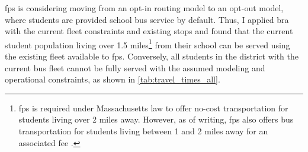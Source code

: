\gls{fps} is considering moving from an opt-in routing model to an opt-out model, where students are provided school bus service by default. Thus, I applied \gls{bra} with the current fleet constraints and existing stops and found that the current student population living over 1.5 miles\footnote{\gls{fps} is required under Massachusetts law to offer no-cost transportation for students living over 2 miles away. However, as of writing, \gls{fps} also offers bus transportation for students living between 1 and 2 miles away for an associated fee \cite{framinghampublicschoolsRider, framinghamschoolcommittee2022Student}.} from their school can be served using the existing fleet available to \gls{fps}. Conversely, all students in the district with the current bus fleet cannot be fully served with the assumed modeling and operational constraints, as shown in \autoref{tab:travel_times_all}. 

\begin{table}[!htbp]
    \caption{Estimated travel times of students in minutes with different routing configurations with the set of all students. Does not account for intersection delay, assumes constant bus speed.}
    \label{tab:travel_times_all}
\end{table}

